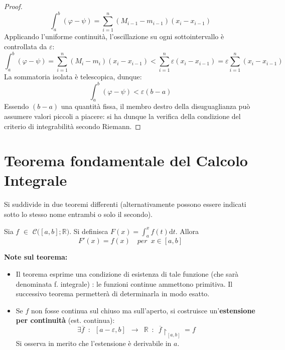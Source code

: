 \documentclass[10pt, oneside]{book}
\theoremstyle{plain}
\begin{document}
\begin{proof}
    \[\int_a^b (\varphi - \psi) = \sum\limits_{i=1}^n (M_{i-1} - m_{i-1}) (x_i - x_{i-1})\]
    Applicando l'uniforme continuità, l'oscillazione su ogni sottointervallo è controllata da $\varepsilon$:
    \[\int_a^b (\varphi - \psi) = \sum\limits_{i=1}^n (M_i - m_i) (x_i - x_{i-1}) < \sum\limits_{i=1}^n \varepsilon (x_i - x_{i-1}) = \varepsilon \sum\limits_{i=1}^n (x_i - x_{i-1})\]
    La sommatoria isolata è telescopica, dunque:
    \[\int_a^b (\varphi - \psi) < \varepsilon (b - a)\]
    Essendo $(b - a)$ una quantità fissa, il membro destro della disuguaglianza può assumere valori piccoli a piacere: si ha dunque la verifica della condizione del criterio di integrabilità secondo Riemann.
\end{proof}

\section{Teorema fondamentale del Calcolo Integrale}
Si suddivide in due teoremi differenti (alternativamente possono essere indicati sotto lo stesso nome entrambi o solo il secondo).

\begin{ther}[Teorema 1]
    Sia $f$ $\in$ $\mathcal{C}\big([a,b] ; \mathbb{R}\big)$. Si definisca $F(x) = \int_a^x f(t) \textrm{d}t$. Allora
    \[F'(x) = f(x) \quad per \enspace x \in [a,b]\]
\end{ther}
\textbf{Note sul teorema:}
\begin{itemize}[label=$\blacksquare$]
    \item Il teorema esprime una condizione di esistenza di tale funzione (che sarà denominata f. integrale) : le funzioni continue ammettono primitiva. Il successivo teorema permetterà di determinarla in modo esatto.
    \item Se $f$ non fosse continua sul chiuso ma sull'aperto, si costruisce un'\textbf{estensione per continuità} (est. continua):
    \[\exists \overline{f} \enspace : \enspace [a-\varepsilon,b] \enspace \rightarrow \enspace \mathbb{R} \enspace : \enspace \overline{f}\restriction_{[a,b]} = f\]
    Si osserva in merito che l'estensione è derivabile in $a$.
\end{itemize}
\end{document}
